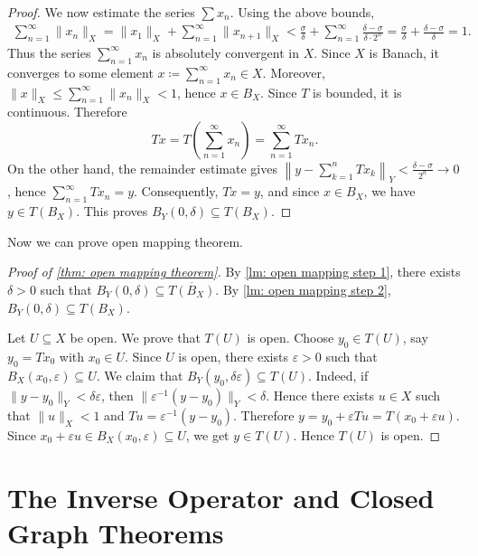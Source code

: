 \begin{proof}
    We now estimate the series \(\sum x_n\). Using the above bounds,
    \begin{align*}
        \sum_{n=1}^{\infty} \lVert x_n \rVert_X = \lVert x_1 \rVert_X + \sum_{n=1}^{\infty} \lVert x_{n+1} \rVert_X < \frac{\sigma}{\delta} + \sum_{n=1}^{\infty} \frac{\delta - \sigma}{\delta \cdot 2^n} = \frac{\sigma}{\delta} + \frac{\delta - \sigma}{\delta} = 1.
    \end{align*}
    Thus the series \(\sum_{n=1}^{\infty} x_n\) is absolutely convergent in \(X\). Since \(X\) is Banach, it converges to some element \(x \coloneqq \sum_{n=1}^{\infty} x_n \in X\). Moreover, \(\lVert x \rVert_X \leq \sum_{n=1}^{\infty} \lVert x_n \rVert_X < 1\), hence \(x \in B_X\). Since \(T\) is bounded, it is continuous. Therefore
    \[
        Tx = T\!\left( \sum_{n=1}^{\infty} x_n \right) = \sum_{n=1}^{\infty} T x_n.
    \]
    On the other hand, the remainder estimate gives \(\left\lVert y - \sum_{k=1}^n T x_k \right\rVert_Y < \frac{\delta - \sigma}{2^n} \to 0\), hence \(\sum_{n=1}^{\infty} T x_n = y\). Consequently, \(Tx = y\), and since \(x \in B_X\), we have \(y \in T(B_X)\). This proves \(B_Y(0, \delta) \subseteq T(B_X)\).
\end{proof}

Now we can prove open mapping theorem.
\begin{proof}[Proof of \autoref{thm: open mapping theorem}]
    By \autoref{lm: open mapping step 1}, there exists \(\delta > 0\) such that \(B_Y(0, \delta) \subseteq \overline{T(B_X)}\). By \autoref{lm: open mapping step 2}, \(B_Y(0, \delta) \subseteq T(B_X)\).

    Let \(U \subseteq X\) be open. We prove that \(T(U)\) is open. Choose \(y_0 \in T(U)\), say \(y_0 = Tx_0\) with \(x_0 \in U\). Since \(U\) is open, there exists \(\varepsilon > 0\) such that \(B_X(x_0, \varepsilon) \subseteq U\). We claim that \(B_Y(y_0, \delta\varepsilon) \subseteq T(U)\). Indeed, if \(\lVert y - y_0 \rVert_Y < \delta\varepsilon\), then \(\lVert \varepsilon^{-1}(y - y_0) \rVert_Y < \delta\). Hence there exists \(u \in X\) such that \(\lVert u \rVert_X < 1\) and \(Tu = \varepsilon^{-1}(y - y_0)\). Therefore \(y = y_0 + \varepsilon Tu = T(x_0 + \varepsilon u)\). Since \(x_0 + \varepsilon u \in B_X(x_0, \varepsilon) \subseteq U\), we get \(y \in T(U)\). Hence \(T(U)\) is open.
\end{proof}

\section{The Inverse Operator and Closed Graph Theorems}

